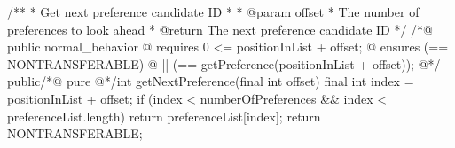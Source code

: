 \begin{lstownjava}
 /**
   * Get next preference candidate ID
   * 
   * @param offset
   *          The number of preferences to look ahead
   * @return The next preference candidate ID
   */
  /*@ public normal_behavior
    @   requires 0 <= positionInList + offset;
    @   ensures (\result == NONTRANSFERABLE)
    @     || (\result == getPreference(positionInList + offset));
    @*/
  public/*@ pure @*/int getNextPreference(final int offset) {
    final int index = positionInList + offset;
    if (index < numberOfPreferences && index < preferenceList.length) {
      return preferenceList[index];
    }
    return NONTRANSFERABLE;
  }
\end{lstownjava}
